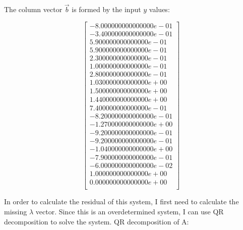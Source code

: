\documentclass{article}
\begin{document}
The column vector $\vec{b}$ is formed by the input $y$ values:

$$
\begin{bmatrix} 
-8.000000000000000e-01\\
-3.400000000000000e-01\\
5.900000000000000e-01\\
5.900000000000000e-01\\
2.300000000000000e-01\\
1.000000000000000e-01\\
2.800000000000000e-01\\
1.030000000000000e+00\\
1.500000000000000e+00\\
1.440000000000000e+00\\
7.400000000000000e-01\\
-8.200000000000000e-01\\
-1.270000000000000e+00\\
-9.200000000000000e-01\\
-9.200000000000000e-01\\
-1.040000000000000e+00\\
-7.900000000000000e-01\\
-6.000000000000000e-02\\
1.000000000000000e+00\\
0.000000000000000e+00\\
\end{bmatrix}
$$

In order to calculate the residual of this system, I first need to calculate the missing $\lambda$ vector. Since this is an overdetermined system, I can use QR decomposition to solve the system. QR decomposition of A:
\end{document}
